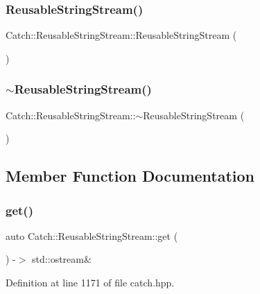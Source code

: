 \subsubsection{ReusableStringStream()}
{\footnotesize\ttfamily Catch\+::\+Reusable\+String\+Stream\+::\+Reusable\+String\+Stream (\begin{DoxyParamCaption}{ }\end{DoxyParamCaption})}

\mbox{\label{class_catch_1_1_reusable_string_stream_aba9384e258a4db3178447b6a58414712}} 
\subsubsection{$\sim$ReusableStringStream()}
{\footnotesize\ttfamily Catch\+::\+Reusable\+String\+Stream\+::$\sim$\+Reusable\+String\+Stream (\begin{DoxyParamCaption}{ }\end{DoxyParamCaption})}



\subsection{Member Function Documentation}
\mbox{\label{class_catch_1_1_reusable_string_stream_a6881808c60a080d4e24a0b81c94cbf67}} 
\subsubsection{get()}
{\footnotesize\ttfamily auto Catch\+::\+Reusable\+String\+Stream\+::get (\begin{DoxyParamCaption}{ }\end{DoxyParamCaption}) -\/$>$ std\+::ostream\& \hspace{0.3cm}{\ttfamily [inline]}}



Definition at line 1171 of file catch.\+hpp.

\mbox{\label{class_catch_1_1_reusable_string_stream_af95f72024c082db70e5e50782e28e4f6}} 
